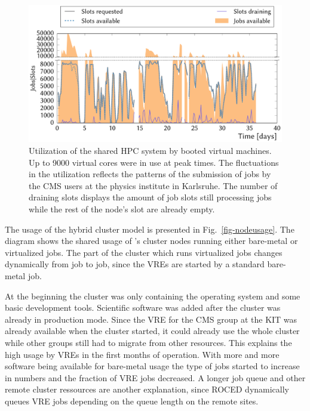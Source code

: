\begin{figure}
\begin{center}
  \includegraphics[width=1.0\linewidth]{NEMO_KIT_utiliztion.pdf}
  \caption{Utilization of the shared HPC system by booted virtual machines. Up to 9000 virtual cores were in use at peak times. The fluctuations in the utilization reflects the patterns of the submission of jobs by the CMS users at the physics institute in Karlsruhe. The number of draining slots displays the amount of job slots still processing jobs while the rest of the node's slot are already empty.}
  \label{fig-frplots}
\end{center}
\end{figure}

The usage of the hybrid cluster model is presented in Fig.~\ref{fig-nodeusage}.
The diagram shows the shared usage of \NEMO's cluster nodes running either
bare-metal or virtualized jobs. The part of the cluster which runs virtualized
jobs changes dynamically from job to job, since the VREs are started by
a standard bare-metal job.

At the beginning the cluster was only containing the operating system and some
basic development tools. Scientific software was added after the cluster was
already in production mode. Since the VRE for the CMS group at the KIT was already
available when the \NEMO cluster started, it could already use the whole cluster
while other groups still had to migrate from other resources. This explains the high usage by VREs in the first months of
operation. With more and more software being available for bare-metal usage the
type of jobs started to increase in numbers and the fraction of VRE
jobs decreased. A longer job queue and other remote cluster ressources are
another explanation, since ROCED dynamically queues VRE jobs depending on the
queue length on the remote sites.

